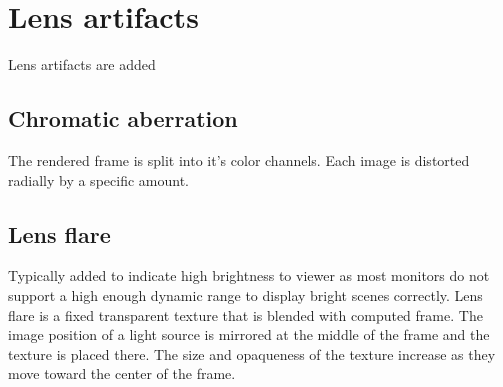 \chapter{Lens artifacts}
\label{ch:Content2}
Lens artifacts are added 
\section{Chromatic aberration}
\label{ch:Content2:sec:Section1}
The rendered frame is split into it's color channels.
Each image is distorted radially by a specific amount.

\section{Lens flare}
\label{ch:Content2:sec:Section2}
Typically added to indicate high brightness to viewer as most monitors do not support a high enough dynamic range to display bright scenes correctly.
Lens flare is a fixed transparent texture that is blended with computed frame.
The image position of a light source is mirrored at the middle of the frame and the texture is placed there.
The size and opaqueness of the texture increase as they move toward the center of the frame.